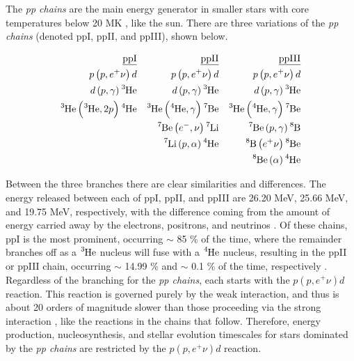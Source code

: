 The \textit{pp chains} are the main energy generator in smaller stars with core temperatures below 20 MK \cite{RyanNortonBook}, like the sun. There are three variations of the \textit{pp chains} (denoted ppI, ppII, and ppIII), shown below.

\begin{align*}
\underline{\mathrm{ppI}} & & \underline{\mathrm{ppII}} & &\underline{\mathrm{ppIII}}  & \\
p\left(p, e^{+} \nu \right) d & & p\left(p, e^{+} \nu \right) d & & p\left(p, e^{+} \nu \right) d \\
d\left(p, \gamma \right) \ce{^{3}He} & & d\left(p, \gamma \right) \ce{^{3}He} & & d\left(p, \gamma \right) \ce{^{3}He} \\ 
\ce{^{3}He} \left( \ce{^{3}He}, 2p \right) \ce{^{4}He} & & \ce{^{3}He} \left( \ce{^{4}He}, \gamma \right) \ce{^{7}Be} &  &  \ce{^{3}He} \left( \ce{^{4}He}, \gamma \right) \ce{^{7}Be}  \\
& & \ce{^{7}Be}  \left( e^{-}, \nu \right) \ce{^{7}Li} & & \ce{^{7}Be} \left( p, \gamma \right) \ce{^{8}B} \\
& & \ce{^{7}Li} \left( p, \alpha \right) \ce{^{4}He} & & \ce{^{8}B} \left( e^{+} \nu \right) \ce{^{8}Be} \\
& & & & \ce{^{8}Be} \left( \alpha \right) \ce{^{4}He} 
\end{align*}

Between the three branches there are clear similarities and differences. The energy released between each of ppI, ppII, and ppIII are 26.20 MeV, 25.66 MeV, and 19.75 MeV, respectively, with the difference coming from the amount of energy carried away by the electrons, positrons, and neutrinos \cite{IliadisBook}. Of these chains, ppI is the most prominent, occurring $\sim$ 85 \% of the time, where the remainder branches off as a $\ce{^{3}He}$ nucleus will fuse with a $\ce{^{4}He}$ nucleus, resulting in the ppII or ppIII chain, occurring $\sim$ 14.99 \% and $\sim$ 0.1 \% of the time, respectively \cite{RyanNortonBook}. Regardless of the branching for the \textit{pp chains}, each starts with the $p\left(p, e^{+} \nu \right) d$ reaction. This reaction is governed purely by the weak interaction, and thus is about 20 orders of magnitude slower than those proceeding via the strong interaction \cite{RolfsBook}, like the reactions in the chains that follow. Therefore, energy production, nucleosynthesis, and stellar evolution timescales for stars dominated by the \textit{pp chains} are restricted by the $p\left(p, e^{+} \nu \right) d$ reaction.


